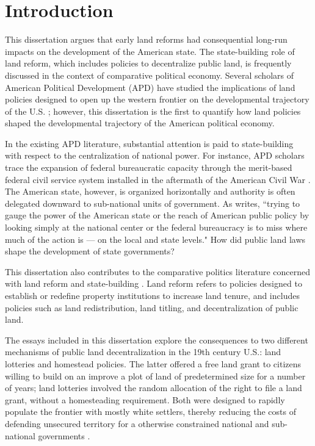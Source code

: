 \chapter{Introduction}

This dissertation argues that early land reforms had consequential long-run impacts on the development of the American state. The state-building role of land reform, which includes policies to decentralize public land, is frequently discussed in the context of comparative political economy. Several scholars of American Political Development (APD) have studied the implications of land policies designed to open up the western frontier on the developmental trajectory of the U.S. \citep[e.g.,][]{bensel1990,frymer2014rush}; however, this dissertation is the first to quantify how land policies shaped the developmental trajectory of the American political economy.

In the existing APD literature, substantial attention is paid to state-building with respect to the centralization of national power.  For instance, APD scholars trace the expansion of federal bureaucratic capacity through the merit-based federal civil service system installed in the aftermath of the American Civil War \citep{skowronek1982building,bensel1990,carpenter2001}. The American state, however, is organized horizontally and authority is often delegated downward to sub-national units of government. As \citet{novak2008myth} writes, ``trying to gauge the power of the American state or the reach of American public policy by looking simply at the national center or the federal bureaucracy is to miss where much of the action is --- on the local and state levels." How did public land laws shape the development of state governments?

This dissertation also contributes to the comparative politics literature concerned with land reform and state-building  \citep[e.g.,][]{albertus2015autocracy, murtazashvili2016does}. Land reform refers to policies designed to establish or redefine property institutions to increase land tenure, and includes policies such as land redistribution, land titling, and decentralization of public land. 

The essays included in this dissertation explore the consequences to two different mechanisms of public land decentralization in the 19th century U.S.: land lotteries and homestead policies. The latter offered a free land grant to citizens willing to build on an improve a plot of land of predetermined size for a number of years; land lotteries involved the random allocation of the right to file a land grant, without a homesteading requirement. Both were designed to rapidly populate the frontier with mostly white settlers, thereby reducing the costs of defending unsecured territory for a otherwise constrained national and sub-national governments \citep{frymer2014rush}.

